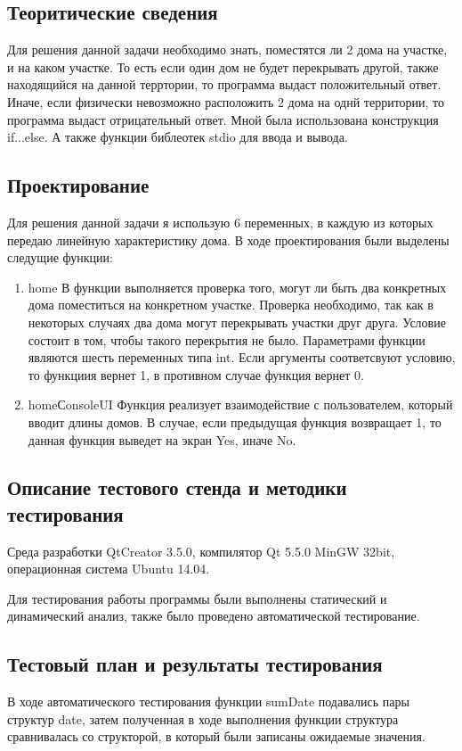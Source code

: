 \documentclass[12pt,a4paper]{report}
\begin{document}
\subsection{Теоритические сведения}
Для решения данной задачи необходимо знать, поместятся ли 2 дома на участке, и на каком участке. То есть если один дом не будет перекрывать другой, также находящийся на данной терртории, то программа выдаст положительный ответ. Иначе, если физически невозможно расположить 2 дома на однй территории, то программа выдаст отрицательный ответ. Мной была использована конструкция if...else. А также  функции библеотек stdio для ввода и вывода.
	
\subsection{Проектирование}
	Для решения данной задачи я использую 6 переменных, в каждую из которых передаю линейную характеристику дома.
	В ходе проектирования были выделены следущие функции:
\begin{enumerate}
	\item home
	В  функции выполняется проверка того, могут ли быть два конкретных дома поместиться на конкретном  участке. Проверка необходимо, так как в некоторых случаях два дома могут перекрывать участки друг друга. Условие состоит в том, чтобы такого перекрытия не было.
	Параметрами функции являются шесть переменных типа int. Если аргументы соответсвуют условию, то функциия вернет 1, в противном случае функция вернет 0.
		\item homeСonsoleUI
	Функция реализует взаимодействие с пользователем, который вводит длины домов. В случае, если предыдущая функция возвращает 1, то данная функция выведет на экран Yes, иначе No.
\end{enumerate}

\subsection{Описание тестового стенда и методики тестирования}
Среда разработки QtCreator 3.5.0, компилятор Qt 5.5.0 MinGW 32bit, операционная система Ubuntu 14.04.

Для тестирования работы программы были выполнены статический и динамический анализ, также было проведено автоматической тестирование.

\subsection{Тестовый план и результаты тестирования}
В ходе автоматического тестирования функции sumDate подавались пары структур date, затем полученная в ходе выполнения функции структура сравнивалась со структорой, в который были записаны ожидаемые значения.
\end{document}
